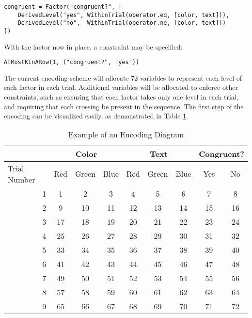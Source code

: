 \begin{verbatim}
congruent = Factor("congruent?", [
    DerivedLevel("yes", WithinTrial(operator.eq, [color, text])),
    DerivedLevel("no",  WithinTrial(operator.ne, [color, text]))
])
\end{verbatim}

With the factor now in place, a constraint may be specified:

\begin{verbatim}
AtMostKInARow(1, ("congruent?", "yes"))
\end{verbatim}

The current encoding scheme will allocate 72 variables to represent each level of each factor in each trial. Additional variables will be allocated to enforce other constraints, such as ensuring that each factor takes only one level in each trial, and requiring that each crossing be present in the sequence. The first step of the encoding can be visualized easily, as demonstrated in Table \ref{tab:encoding_diagram}.

\begin{table}[htb]
  \centering
  \caption{Example of an Encoding Diagram}
\begin{tabular}{|r|c|c|c|c|c|c|c|c|}
\hline
\multicolumn{1}{|l|}{}             & \multicolumn{3}{c|}{Color} & \multicolumn{3}{c|}{Text} & \multicolumn{2}{c|}{Congruent?} \\ \hline
\multicolumn{1}{|l|}{Trial Number} & Red    & Green    & Blue   & Red    & Green   & Blue   & Yes             & No            \\ \hline
1                                  & 1      & 2        & 3      & 4      & 5       & 6      & 7               & 8             \\ \hline
2                                  & 9      & 10       & 11     & 12     & 13      & 14     & 15              & 16            \\ \hline
3                                  & 17     & 18       & 19     & 20     & 21      & 22     & 23              & 24            \\ \hline
4                                  & 25     & 26       & 27     & 28     & 29      & 30     & 31              & 32            \\ \hline
5                                  & 33     & 34       & 35     & 36     & 37      & 38     & 39              & 40            \\ \hline
6                                  & 41     & 42       & 43     & 44     & 45      & 46     & 47              & 48            \\ \hline
7                                  & 49     & 50       & 51     & 52     & 53      & 54     & 55              & 56            \\ \hline
8                                  & 57     & 58       & 59     & 60     & 61      & 62     & 63              & 64            \\ \hline
9                                  & 65     & 66       & 67     & 68     & 69      & 70     & 71              & 72            \\ \hline
\end{tabular}
\label{tab:encoding_diagram}
\end{table}

